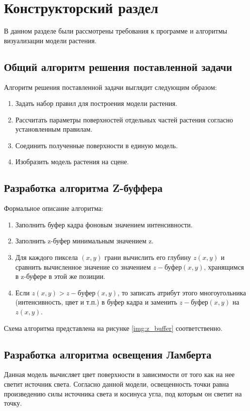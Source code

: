 \chapter{Конструкторский раздел}
В данном разделе были рассмотрены требования к программе и алгоритмы визуализации модели растения.

\section{Общий алгоритм решения поставленной задачи}
Алгоритм решения поставленной задачи выглядит следующим образом:
\begin{enumerate}
	\item Задать набор правил для построения модели растения.
	\item Рассчитать параметры поверхностей отдельных частей растения согласно установленным правилам.
	\item Соединить полученные поверхности в единую модель.
        \item Изобразить модель растения на сцене.
\end{enumerate}


\section{Разработка алгоритма Z-буффера}

Формальное описание алгоритма:
\begin{enumerate}
    \item Заполнить буфер кадра фоновым значением интенсивности.
    \item Заполнить z-буфер минимальным значением z.
    \item Для каждого пиксела $(x, y)$ грани вычислить его глубину $z(x, y)$ и
сравнить вычисленное значение со значением $z-$буфер$(x, y)$,
хранящимся в z-буфере в этой же позиции.
    \item Если $z(x, y) > z-буфер(x, y)$, то записать атрибут этого многоугольника (интенсивность, цвет и т.п.) в буфер кадра и заменить $z-$буфер$(x, y)$ на $z(x, y)$.
\end{enumerate}

Схема алгоритма представлена на рисунке \ref{img:z_buffer} соответственно.




\section{Разработка алгоритма освещения Ламберта}
Данная модель вычисляет цвет поверхности в зависимости от того как на нее светит источник света. Согласно данной модели, освещенность точки равна произведению силы источника света и косинуса угла, под которым он светит на
точку.

